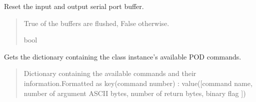 \documentclass[letterpaper,10pt,english]{sphinxmanual}
\begin{document}
\begin{fulllineitems}
\begin{fulllineitems}
\begin{quote}
\begin{description}
\end{description}\end{quote}

\end{fulllineitems}


\begin{fulllineitems}
\label{\detokenize{BasicPodProtocol:BasicPodProtocol.POD_Basics.FlushPort}}
\pysigstartsignatures
{}
\pysigstopsignatures
\sphinxAtStartPar
Reset the input and output serial port buffer.
\begin{quote}\begin{description}
\sphinxAtStartPar
True of the buffers are flushed, False otherwise.

\sphinxAtStartPar
bool

\end{description}\end{quote}

\end{fulllineitems}


\begin{fulllineitems}
\label{\detokenize{BasicPodProtocol:BasicPodProtocol.POD_Basics.GetDeviceCommands}}
\pysigstartsignatures
{}
\pysigstopsignatures
\sphinxAtStartPar
Gets the dictionary containing the class instance’s available POD commands.
\begin{quote}\begin{description}
\sphinxAtStartPar
Dictionary containing the available commands and their                 information.Formatted as key(command number) : value({[}command name, number of argument                 ASCII bytes, number of return bytes, binary flag {]})


\end{description}
\end{quote}
\end{fulllineitems}
\end{fulllineitems}
\end{document}
